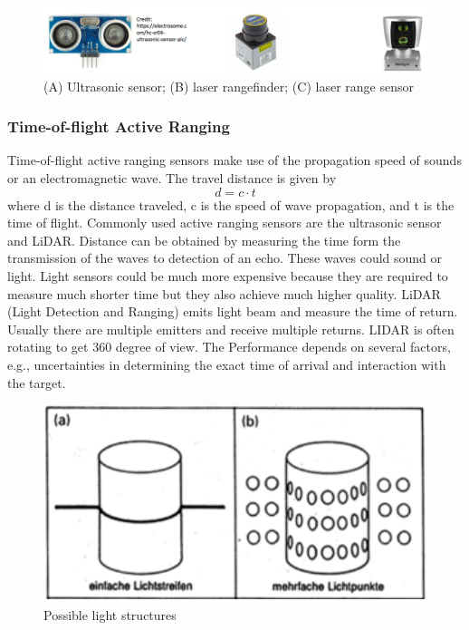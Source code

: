 \begin{figure} 
\centering
\includegraphics[scale=0.4]{ultra.png}
\caption{(A) Ultrasonic sensor; (B) laser rangefinder; (C) laser range sensor}
\label{fig:active_range}
\end{figure}

\subsubsection{Time-of-flight Active Ranging}
Time-of-flight active ranging sensors make use of the propagation speed of sounds or an electromagnetic wave. The travel distance is given by 
$$d = c \cdot t$$
where d is the distance traveled, c is the speed of wave propagation, and t is the time of flight. Commonly used active ranging sensors are the ultrasonic sensor and LiDAR. Distance can be obtained by measuring the time form the transmission of the waves to detection of an echo. These waves could sound or light. Light sensors could be much more expensive because they are required to measure much shorter time but they also achieve much higher quality. LiDAR (Light Detection and Ranging) emits light beam and measure the time of return. Usually there are multiple emitters and receive multiple returns. LIDAR is often rotating to get 360 degree of view. The Performance depends on several factors, e.g., uncertainties in determining the exact time of arrival and interaction with the target.
\begin{figure} 
\centering
\includegraphics[scale=0.2]{light.png}
\caption{Possible light structures \cite{SNS}}
\label{fig:3D_light}
\end{figure}


